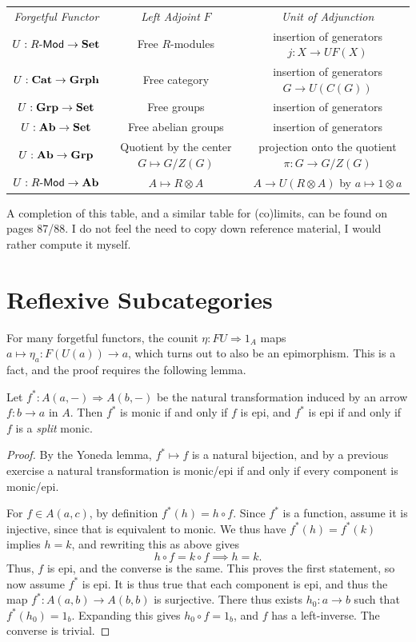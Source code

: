 \begin{tabular}{ccc}
	\emph{Forgetful Functor} & \emph{Left Adjoint} $F$ & \emph{Unit of Adjunction} \\
	$U : R\text{-}\mathsf{Mod}  \to \mathbf{Set} $ & Free $R$-modules & insertion of generators $j : X \to UF(X)$ \\
	$U : \mathbf{Cat}  \to \mathbf{Grph} $ & Free category & insertion of generators $G\to U(C(G))$\\
	$U : \mathbf{Grp}  \to \mathbf{Set} $ & Free groups & insertion of generators \\
	$U : \mathbf{Ab} \to \mathbf{Set} $ & Free abelian groups & insertion of generators \\
	$U : \mathbf{Ab} \to \mathbf{Grp} $ & Quotient by the center $G\mapsto G/Z(G)$ & projection onto the quotient $\pi : G \to G/Z(G)$\\
	$U : R\text{-}\mathsf{Mod}  \to \mathbf{Ab}$ & $A\mapsto R\otimes A$ & $A\to U(R\otimes A)$ by $a\mapsto 1\otimes a$\\
\end{tabular}
A completion of this table, and a similar table for (co)limits, can be found on pages 87/88. I do not feel the need to copy down reference material, I would rather compute it myself.

\section{Reflexive Subcategories}

For many forgetful functors, the counit $\eta : FU \Rightarrow 1_A$ maps $a\mapsto \eta _a : F(U(a))\to a$, which turns out to also be an epimorphism. This is a fact, and the proof requires the following lemma.

\begin{lemma}\label{lma:4.1}
	Let $f^* : A(a,-) \Rightarrow A(b,-)$ be the natural transformation induced by an arrow $f : b \to a$ in $A$. Then $f^*$ is monic if and only if $f$ is epi, and $f^*$ is epi if and only if $f$ is a \emph{split} monic.
\end{lemma}
\begin{proof}
	By the Yoneda lemma, $f^* \mapsto f$ is a natural bijection, and by a previous exercise a natural transformation is monic/epi if and only if every component is monic/epi.

	For $f\in A(a,c)$, by definition $f^*(h)=h\circ f$. Since $f^*$ is a function, assume it is injective, since that is equivalent to monic. We thus have $f^*(h)=f^*(k)$ implies $h=k$, and rewriting this as above gives
	\[
		h\circ f=k\circ f \implies h=k
	.\]
	Thus, $f$ is epi, and the converse is the same. This proves the first statement, so now assume $f^*$ is epi. It is thus true that each component is epi, and thus the map $f^* : A(a,b) \to A(b,b)$ is surjective. There thus exists $h_0 : a \to b$ such that $f^*(h_0)=1_b$. Expanding this gives $h_0 \circ f=1_b$, and $f$ has a left-inverse. The converse is trivial.
\end{proof}

